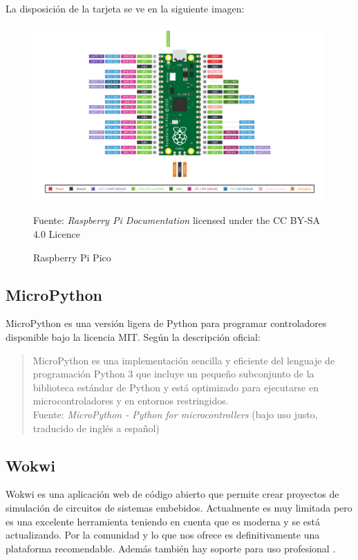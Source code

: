 \documentclass{article}
\begin{document}
    La disposición de la tarjeta se ve en la siguiente imagen:

    \begin{figure}[H]
        \centering
        \includegraphics[width=0.5\paperwidth]{images/pico-r3-sdk11-pinout}
        \caption{Raspberry Pi Pico}\footnotesize
        Fuente: \textit{Raspberry Pi Documentation} licensed under the CC
        BY-SA 4.0 Licence \cite{raspberry-pi-ltd-2022}
    \end{figure}

    \subsection{MicroPython}

    MicroPython es una versión ligera de Python para programar controladores
    disponible bajo la licencia MIT. Según la descripción oficial:

    \begin{quote}
        MicroPython es una implementación sencilla y eficiente del lenguaje
        de programación Python 3 que incluye un pequeño subconjunto de la
        biblioteca estándar de Python y está optimizado para ejecutarse en
        microcontroladores y en entornos restringidos.\\ \footnotesize
        Fuente: \textit{MicroPython - Python for microcontrollers} (bajo uso
        justo, traducido de inglés a español)
    \end{quote}

    \subsection{Wokwi}

    Wokwi es una aplicación web de código abierto que permite crear proyectos
    de simulación de circuitos de sistemas embebidos. Actualmente es muy
    limitada pero es una excelente herramienta teniendo en cuenta que es
    moderna y se está actualizando. Por la comunidad y lo que nos ofrece es
    definitivamente una plataforma recomendable. Además también hay soporte
    para uso profesional \cite{codemagic-ltd-2022}.
\end{document}
